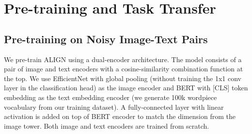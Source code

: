 \documentclass{article}
\begin{document}


\section{Pre-training and Task Transfer}
\subsection{Pre-training on Noisy Image-Text Pairs}
We pre-train ALIGN using a dual-encoder architecture. The model consists of a pair of image and text encoders with a cosine-similarity combination function at the top. We use EfficientNet with global pooling (without training the 1x1 conv layer in the classification head) as the image encoder and BERT with [CLS] token embedding as the text embedding encoder (we generate 100k wordpiece vocabulary from our training dataset). A fully-connected layer with linear activation is added on top of BERT encoder to match the dimension from the image tower. Both image and text encoders are trained from scratch. %
\end{document}
